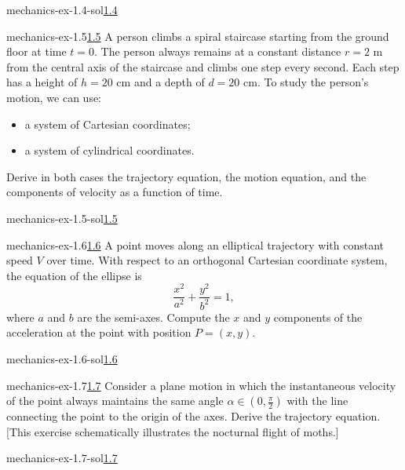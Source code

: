 \documentclass[preview]{standalone}
\begin{document}
\begin{snippetsolution}{mechanics-ex-1.4-sol}{\underline{1.4}}
    \todo
\end{snippetsolution}

\begin{snippetexercise}{mechanics-ex-1.5}{\underline{1.5}}
    A person climbs a spiral staircase starting from the ground floor at time \( t = 0 \). The person always remains at a constant distance \( r = 2 \) m from the central axis of the staircase and climbs one step every second. Each step has a height of \( h = 20 \) cm and a depth of \( d = 20 \) cm. To study the person's motion, we can use:
    \begin{itemize}
        \item a system of Cartesian coordinates;
        \item a system of cylindrical coordinates.
    \end{itemize}
    Derive in both cases the trajectory equation, the motion equation, and the components of velocity as a function of time.
\end{snippetexercise}

\begin{snippetsolution}{mechanics-ex-1.5-sol}{\underline{1.5}}
    \todo
\end{snippetsolution}

\begin{snippetexercise}{mechanics-ex-1.6}{\underline{1.6}}
    A point moves along an elliptical trajectory with constant speed \( V \) over time. With respect to an orthogonal Cartesian coordinate system, the equation of the ellipse is
    \[
    \frac{x^2}{a^2} + \frac{y^2}{b^2} = 1,
    \]
    where \( a \) and \( b \) are the semi-axes. Compute the \( x \) and \( y \) components of the acceleration at the point with position \( P = (x, y) \).
\end{snippetexercise}

\begin{snippetsolution}{mechanics-ex-1.6-sol}{\underline{1.6}}
    \todo
\end{snippetsolution}

\begin{snippetexercise}{mechanics-ex-1.7}{\underline{1.7}}
    Consider a plane motion in which the instantaneous velocity of the point always maintains the same angle \( \alpha \in (0, \frac{\pi}{2}) \) with the line connecting the point to the origin of the axes. Derive the trajectory equation. [This exercise schematically illustrates the nocturnal flight of moths.]
\end{snippetexercise}

\begin{snippetsolution}{mechanics-ex-1.7-sol}{\underline{1.7}}
    \todo
\end{snippetsolution}
\end{document}
